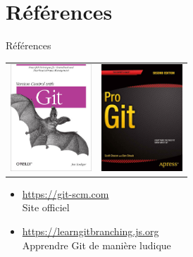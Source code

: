\documentclass[xcolor=x11names,compress]{beamer}
\begin{document}
\section*{Références}
\begin{frame}{Références}
		\centering
	\begin{tabular}{cc}
		\includegraphics[height=4cm]{images/refs/oreally.jpg}&
		\includegraphics[height=4cm]{images/refs/progit.png}\\
	\end{tabular}
	\vfill
	\begin{itemize}
		\item \url{https://git-scm.com}\\
			{Site officiel}
		\item \url{https://learngitbranching.js.org}\\
			{Apprendre Git de manière ludique}

	\end{itemize}
\end{frame}
\end{document}
